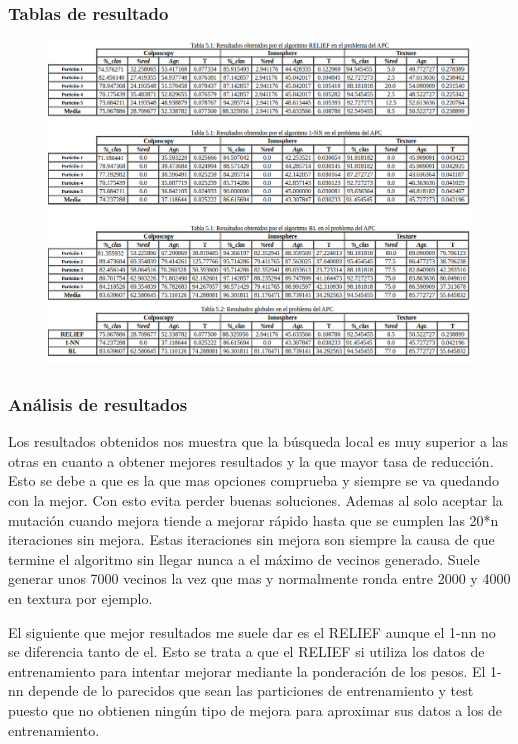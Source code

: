 \documentclass[titlepage]{article}
\begin{document}
	\subsubsection{Tablas de resultado}
	\newpage
	\begin{figure}
		\centering
		\includegraphics[width=1\linewidth]{screen3}
		\caption{}
		\label{fig:screen3}
	\end{figure}
	
	
	
	
	
	
	
	\subsubsection{Análisis de resultados}
	Los resultados obtenidos nos muestra que la búsqueda local es muy superior a las otras en cuanto a obtener mejores resultados y la que mayor tasa de reducción. Esto se debe a que es la que mas opciones comprueba y siempre se va quedando con la mejor. Con esto evita perder buenas soluciones. Ademas al solo aceptar la mutación cuando mejora tiende a mejorar rápido hasta que se cumplen las 20*n iteraciones sin mejora. Estas iteraciones sin mejora son siempre la causa de que termine el algoritmo sin llegar nunca a el máximo de vecinos generado. Suele generar unos 7000 vecinos la vez que mas y normalmente ronda entre 2000 y 4000 en textura por ejemplo.
	
	El siguiente que mejor resultados me suele dar es el RELIEF aunque el 1-nn no se diferencia tanto de el. Esto se trata a que el RELIEF si utiliza los datos de entrenamiento para intentar mejorar mediante la ponderación de los pesos. El 1-nn depende de lo parecidos que sean las particiones de entrenamiento y test puesto que no obtienen ningún tipo de mejora para aproximar sus datos a los de entrenamiento.
	
\end{document}
